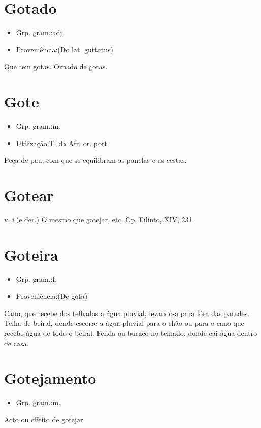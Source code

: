 \section{Gotado}
\begin{itemize}
\item {Grp. gram.:adj.}
\end{itemize}
\begin{itemize}
\item {Proveniência:(Do lat. \textunderscore guttatus\textunderscore )}
\end{itemize}
Que tem gotas.
Ornado de gotas.
\section{Gote}
\begin{itemize}
\item {Grp. gram.:m.}
\end{itemize}
\begin{itemize}
\item {Utilização:T. da Afr. or. port}
\end{itemize}
Peça de pau, com que se equilibram as panelas e as cestas.
\section{Gotear}
\textunderscore v. i.\textunderscore  (e der.)
O mesmo que \textunderscore gotejar\textunderscore , etc. Cp. Filinto, XIV, 231.
\section{Goteira}
\begin{itemize}
\item {Grp. gram.:f.}
\end{itemize}
\begin{itemize}
\item {Proveniência:(De \textunderscore gota\textunderscore )}
\end{itemize}
Cano, que recebe dos telhados a água pluvial, levando-a para fóra das paredes.
Telha de beiral, donde escorre a água pluvial para o chão ou para o cano que recebe água de todo o beiral.
Fenda ou buraco no telhado, donde cái água dentro de casa.
\section{Gotejamento}
\begin{itemize}
\item {Grp. gram.:m.}
\end{itemize}
Acto ou effeito de gotejar.
